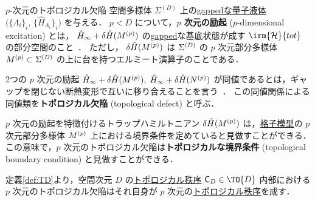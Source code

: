 \documentclass[TQFT_main]{subfiles}
\begin{document}
\begin{mydefph}[label=def:TD]{$p$-次元のトポロジカル欠陥}
    空間多様体 $\Sigma^{(D)}$ 上の\hyperref[def:gappedQL]{gappedな量子液体} $\bigl( \{\Lambda_i\}_i,\, \{\hat{H}_{\Lambda_i}\}_i \bigr)$ を与える．
    $p < D$ について，\textbf{$p$ 次元の励起} ($p$-dimensional excitation) とは，
    $\hat{H}_{\infty} + \delta \hat{H}(M^{(p)})$ の\hyperref[def:gapped]{gapped}な基底状態が成す $\irm{\mathcal{H}}{tot}$ の部分空間のこと~\cite[Definition 5., p.10]{KongWen2014braidedfusioncategoriesgravitational}．
    ただし， $\delta \hat{H}(M^{(p)})$ は $\Sigma^{(D)}$ の $p$ 次元部分多様体 $M^{(p)} \subset \Sigma^{(D)}$ の上に台を持つエルミート演算子のことである．

    \tcblower

    2つの $p$ 次元の励起 $\hat{H}_{\infty} + \delta \hat{H}(M^{(p)}),\; \hat{H}_{\infty} + \delta \hat{H}(N^{(p)})$ が同値であるとは，ギャップを閉じない断熱変形で互いに移り合えることを言う~\cite[Definition 6., p.10]{KongWen2014braidedfusioncategoriesgravitational}．
    この同値関係による同値類を\textbf{トポロジカル欠陥} (topological defect) と呼ぶ．
\end{mydefph}

\begin{marker}
    $p$ 次元の励起を特徴付けるトラップハミルトニアン $\delta \hat{H}(M^{(p)})$ は，\hyperref[def:bosonic-lattice-model]{格子模型}の $p$ 次元部分多様体 $M^{(p)}$ 上における境界条件を定めていると見做すことができる．
    この意味で，$p$ 次元のトポロジカル欠陥は\textbf{トポロジカルな境界条件} (topological boundary condition) と見做すことができる．
\end{marker}

定義\ref{def:TD}より，空間次元 $D$ の\hyperref[def:quantum-phase]{トポロジカル秩序} $\mathsf{C}_D \in \TO{D}$ 内部における $p$ 次元のトポロジカル欠陥はそれ自身が $p$ 次元の\hyperref[def:quantum-phase]{トポロジカル秩序}を成す．
\end{document}

